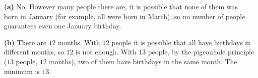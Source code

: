 \textbf{(a)} $\boxed{\text{No}}$. However many people there are, it is possible that none of them was born in January (for example, all were born in March), so no number of people guarantees even one January birthday.

\textbf{(b)} There are $12$ months. With $12$ people it is possible that all have birthdays in different months, so $12$ is not enough. With $13$ people, by the pigeonhole principle ($13$ people, $12$ months), two of them have birthdays in the same month. The minimum is $\boxed{13}$.
